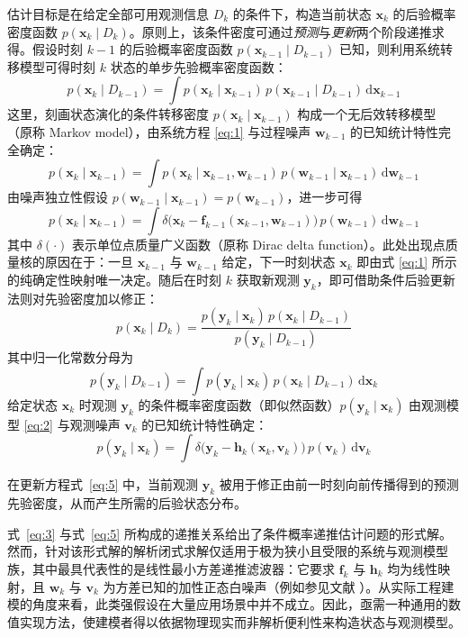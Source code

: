 估计目标是在给定全部可用观测信息 $D_k$ 的条件下，构造当前状态 $\bm{x}_k$ 的后验概率密度函数 $p(\bm{x}_k \mid D_k)$。原则上，该条件密度可通过\emph{预测}与\emph{更新}两个阶段递推求得。假设时刻 $k - 1$ 的后验概率密度函数 $p(\bm{x}_{k-1} \mid D_{k-1})$ 已知，则利用系统转移模型可得时刻 $k$ 状态的单步先验概率密度函数：
\begin{equation}\label{eq:3}
p(\bm{x}_k \mid D_{k-1}) = \int p(\bm{x}_k \mid \bm{x}_{k-1})\,p(\bm{x}_{k-1} \mid D_{k-1})\,\mathrm{d}\bm{x}_{k-1}
\end{equation}
这里，刻画状态演化的条件转移密度 $p(\bm{x}_k \mid \bm{x}_{k-1})$ 构成一个无后效转移模型（原称 Markov model），由系统方程 \eqref{eq:1} 与过程噪声 $\bm{w}_{k-1}$ 的已知统计特性完全确定：
\begin{equation*}
p(\bm{x}_k \mid \bm{x}_{k-1}) = \int p(\bm{x}_k \mid \bm{x}_{k-1}, \bm{w}_{k-1})\,p(\bm{w}_{k-1} \mid \bm{x}_{k-1})\,\mathrm{d}\bm{w}_{k-1}
\end{equation*}
由噪声独立性假设 $p(\bm{w}_{k-1} \mid \bm{x}_{k-1}) = p(\bm{w}_{k-1})$，进一步可得
\begin{equation}\label{eq:4}
p(\bm{x}_k \mid \bm{x}_{k-1}) = \int \delta\bigl(\bm{x}_k - \bm{f}_{k-1}(\bm{x}_{k-1}, \bm{w}_{k-1})\bigr)\,p(\bm{w}_{k-1})\,\mathrm{d}\bm{w}_{k-1}
\end{equation}
其中 $\delta(\cdot)$ 表示单位点质量广义函数（原称 Dirac delta function）。此处出现点质量核的原因在于：一旦 $\bm{x}_{k-1}$ 与 $\bm{w}_{k-1}$ 给定，下一时刻状态 $\bm{x}_k$ 即由式 \eqref{eq:1} 所示的纯确定性映射唯一决定。随后在时刻 $k$ 获取新观测 $\bm{y}_k$，即可借助条件后验更新法则对先验密度加以修正：
\begin{equation}\label{eq:5}
p(\bm{x}_k \mid D_k) = \frac{p(\bm{y}_k \mid \bm{x}_k)\,p(\bm{x}_k \mid D_{k-1})}{p(\bm{y}_k \mid D_{k-1})}
\end{equation}
其中归一化常数分母为
\begin{equation}\label{eq:6}
p(\bm{y}_k \mid D_{k-1}) = \int p(\bm{y}_k \mid \bm{x}_k)\,p(\bm{x}_k \mid D_{k-1})\,\mathrm{d}\bm{x}_k
\end{equation}
给定状态 $\bm{x}_k$ 时观测 $\bm{y}_k$ 的条件概率密度函数（即似然函数）$p(\bm{y}_k \mid \bm{x}_k)$ 由观测模型 \eqref{eq:2} 与观测噪声 $\bm{v}_k$ 的已知统计特性确定：
\begin{equation}\label{eq:7}
p(\bm{y}_k \mid \bm{x}_k) = \int \delta\bigl(\bm{y}_k - \bm{h}_k(\bm{x}_k, \bm{v}_k)\bigr)\,p(\bm{v}_k)\,\mathrm{d}\bm{v}_k
\end{equation}

在更新方程式~\eqref{eq:5} 中，当前观测 $\bm{y}_k$ 被用于修正由前一时刻向前传播得到的预测先验密度，从而产生所需的后验状态分布。

式~\eqref{eq:3} 与式~\eqref{eq:5} 所构成的递推关系给出了条件概率递推估计问题的形式解。然而，针对该形式解的解析闭式求解仅适用于极为狭小且受限的系统与观测模型族，其中最具代表性的是线性最小方差递推滤波器：它要求 $\bm{f}_k$ 与 $\bm{h}_k$ 均为线性映射，且 $\bm{w}_k$ 与 $\bm{v}_k$ 为方差已知的加性正态白噪声（例如参见文献 \cite{r15,r16}）。从实际工程建模的角度来看，此类强假设在大量应用场景中并不成立。因此，亟需一种通用的数值实现方法，使建模者得以依据物理现实而非解析便利性来构造状态与观测模型。

